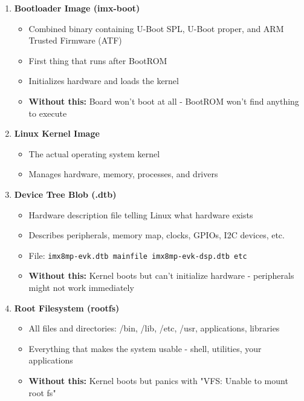\documentclass[12pt,a4paper]{report}
\begin{document}
\begin{enumerate}
    \item \textbf{Bootloader Image (imx-boot)}
    \begin{itemize}
        \item Combined binary containing U-Boot SPL, U-Boot proper, and ARM Trusted Firmware (ATF)
        \item First thing that runs after BootROM
        \item Initializes hardware and loads the kernel
        \item \textbf{Without this:} Board won't boot at all - BootROM won't find anything to execute
    \end{itemize}
    
    \item \textbf{Linux Kernel Image}
    \begin{itemize}
        \item The actual operating system kernel
        \item Manages hardware, memory, processes, and drivers
    \end{itemize}
    
    \item \textbf{Device Tree Blob (.dtb)}
    \begin{itemize}
        \item Hardware description file telling Linux what hardware exists
        \item Describes peripherals, memory map, clocks, GPIOs, I2C devices, etc.
        \item File: \texttt{imx8mp-evk.dtb mainfile imx8mp-evk-dsp.dtb etc}
        \item \textbf{Without this:} Kernel boots but can't initialize hardware - peripherals might not work immediately
    \end{itemize}
    
    \item \textbf{Root Filesystem (rootfs)}
    \begin{itemize}
        \item All files and directories: /bin, /lib, /etc, /usr, applications, libraries
        \item Everything that makes the system usable - shell, utilities, your applications
        \item \textbf{Without this:} Kernel boots but panics with "VFS: Unable to mount root fs"
    \end{itemize}
\end{enumerate}
\end{document}

